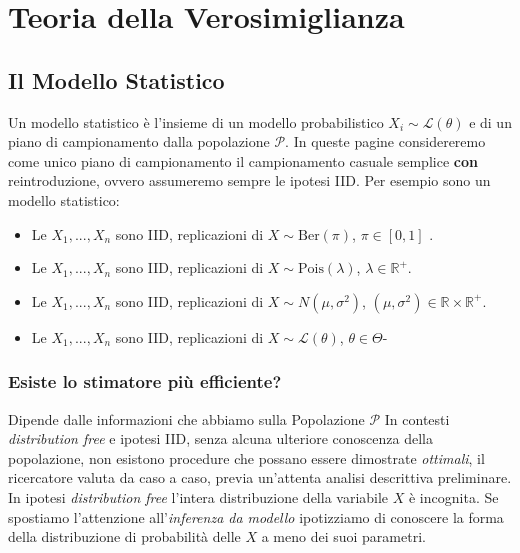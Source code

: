 \documentclass[
  11pt,
]{book}
\providecommand{\tightlist}{%
  \setlength{\itemsep}{0pt}\setlength{\parskip}{0pt}}
\theoremstyle{mytheoremstyle}
\theoremstyle{mydefstyle}
\begin{document}
\chapter{Teoria della Verosimiglianza}\label{teoria-della-verosimiglianza}

\section{Il Modello Statistico}\label{il-modello-statistico-1}

Un modello statistico è l'insieme di un modello probabilistico \(X_i\sim\mathscr{L}(\theta)\)
e di un piano di campionamento dalla popolazione \(\mathscr{P}\).
In queste pagine considereremo come unico piano di campionamento il campionamento casuale semplice \textbf{con} reintroduzione, ovvero assumeremo sempre le ipotesi IID.
Per esempio sono un modello statistico:

\begin{itemize}
\tightlist
\item
  Le \(X_1,...,X_n\) sono IID, replicazioni di \(X\sim\text{Ber}(\pi)\), \(\pi\in[0,1]\) .
\item
  Le \(X_1,...,X_n\) sono IID, replicazioni di \(X\sim\text{Pois}(\lambda)\), \(\lambda\in\mathbb{R}^+\).
\item
  Le \(X_1,...,X_n\) sono IID, replicazioni di \(X\sim N(\mu,\sigma^2)\), \((\mu,\sigma^2)\in\mathbb{R}\times\mathbb{R}^+\).
\item
  Le \(X_1,...,X_n\) sono IID, replicazioni di \(X\sim \mathscr{L}(\theta)\), \(\theta\in\Theta\)-
\end{itemize}

\subsection{Esiste lo stimatore più efficiente?}\label{esiste-lo-stimatore-piuxf9-efficiente}

Dipende dalle informazioni che abbiamo sulla Popolazione \(\mathscr{P}\)
In contesti \emph{distribution free} e ipotesi IID, senza alcuna ulteriore conoscenza della popolazione, non esistono procedure che possano essere dimostrate \emph{ottimali}, il ricercatore valuta da caso a caso, previa un'attenta analisi descrittiva preliminare.
In ipotesi \emph{distribution free} l'intera distribuzione della variabile \(X\) è incognita.
Se spostiamo l'attenzione all'\emph{inferenza da modello} ipotizziamo di conoscere la forma della distribuzione di probabilità delle \(X\) a meno dei suoi parametri.
\end{document}
